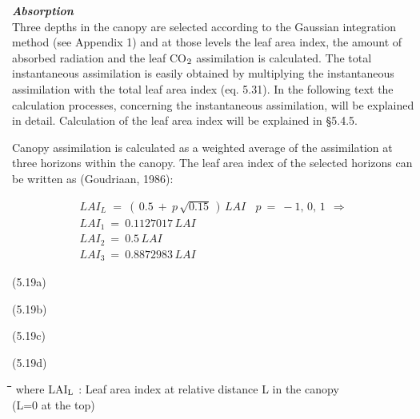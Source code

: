 \documentclass[11pt]{article}
\begin{document}
\bigskip
 {\it {\bf Absorption}\/}\\
Three depths in the canopy are selected according to the Gaussian integration method (see
Appendix 1) and at those levels the leaf area index, the amount of absorbed radiation and
the leaf CO$_{{\rm 2}}$ assimilation is calculated. The total instantaneous assimilation is easily
obtained by multiplying the instantaneous assimilation with the total leaf area index (eq.
5.31). In the following text the calculation processes, concerning the instantaneous
assimila\-tion, will be explained in detail. Calculation of the leaf area index will be
explained in \S 5.4.5.

\bigskip
Canopy assimilation is calculated as a weighted average of the assimilation at three
horizons within the canopy. The leaf area index of the selected horizons can be written as
(Goudriaan, 1986):

\begin{eqnarray*}
 LAI _{L~~} =~(\, 0.5~+~p\, \sqrt{0.15} \, )\, LAI~~~~p~=~-1,\, 0,\, 1~~ \Rightarrow   \nonumber  \\
LAI _{1} ~=~0.1127017\, LAI \nonumber  \\
LAI _{2} ~=~0.5\, LAI \nonumber  \\
LAI _{3} ~=~0.8872983\, LAI
\end{eqnarray*}

 \bigskip
\strut\hfill (5.19a)\\
\strut\hfill (5.19b)\\
\strut\hfill (5.19c)\\
\strut\hfill (5.19d)

\nwln
\begin{tabbing}
\hspace{1.27cm}\=\hspace{1.27cm}\=\hspace{1.27cm}\=\hspace{1.27cm}\=%
\hspace{1.27cm}\=\hspace{1.27cm}\=\hspace{1.27cm}\=\hspace{1.27cm}\=%
\hspace{1.27cm}\=\hspace{1.27cm}\=\kill
where\> LAI$_{{\rm L}}$\> : Leaf area index at relative distance L in the canopy \> \> \> \> \> \> \> \> [ha ha$^{{\rm -1}}$]\\
\>\>   (L=0 at the top)
\end{tabbing}
\end{document}
